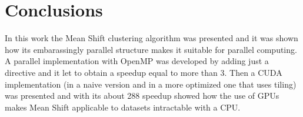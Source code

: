 \documentclass[10pt,twocolumn,letterpaper]{article}
\begin{document}
\section{Conclusions}
In this work the Mean Shift clustering algorithm was presented and it was shown how its embarassingly parallel structure makes it suitable for parallel computing. A parallel implementation with OpenMP was developed by adding just a directive and it let to obtain a speedup equal to more than 3. Then a CUDA implementation (in a naive version and in a more optimized one that uses tiling) was presented and with its about 288 speedup showed how the use of GPUs makes Mean Shift applicable to datasets intractable with a CPU.

{\small


}
\end{document}
